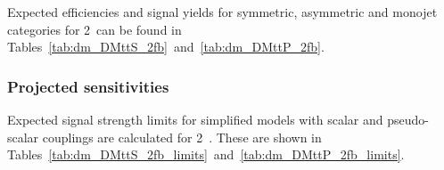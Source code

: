 Expected efficiencies and signal yields for symmetric, asymmetric and monojet
categories for 2~\ifb can be found in
Tables~\ref{tab:dm_DMttS_2fb}~and~\ref{tab:dm_DMttP_2fb}.

\clearpage 
 \clearpage


\subsubsection{Projected sensitivities}

Expected signal strength limits for simplified \DMtt models with scalar and
pseudo-scalar couplings are calculated for 2~\ifb. These are shown in
Tables~\ref{tab:dm_DMttS_2fb_limits}~and~\ref{tab:dm_DMttP_2fb_limits}. 









